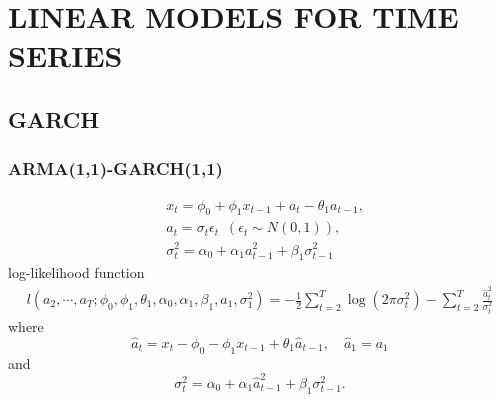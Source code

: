 \documentclass{report}
\theoremstyle{nonumberplain}
\newcommand{\0}{\mathbf{0}}
\begin{document}
\chapter{LINEAR MODELS FOR TIME SERIES}
\section{GARCH}
\subsection{ARMA(1,1)-GARCH(1,1)}

\begin{align*}
&x_t=\phi_0+\phi_1x_{t-1}+a_t-\theta_1a_{t-1}, \\
& a_t=\sigma_t\epsilon_t\ \;(\epsilon_t\sim N(0,1)),\\
&  \sigma_t^2=\alpha_0+\alpha_1a_{t-1}^2
+\beta_1\sigma_{t-1}^2
\end{align*}
log-likelihood function
\begin{align*}
l(a_2,\cdots,a_T;\phi_0,\phi_1,\theta_1,\alpha_0,\alpha_1,\beta_1,a_1,\sigma_1^2)=-\frac{1}{2}\sum_{t=2}^{T}\log(2\pi \sigma_t^2)-\sum_{t=2}^{T}\frac{\hat{a}_t^2}{\sigma_t^2}
\end{align*}
where
\[
\hat{a}_t=x_t-\phi_0-\phi_1x_{t-1}+\theta_1\hat{a}_{t-1},\quad\hat{a}_{1}=a_1
\]
and
\[
\sigma_t^2=\alpha_0+\alpha_1\hat{a}_{t-1}^2
+\beta_1\sigma_{t-1}^2.
\]
\end{document}
